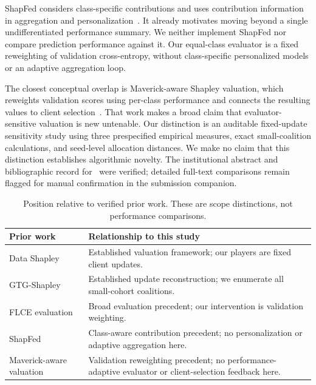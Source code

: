 \documentclass[conference,letterpaper]{IEEEtran}
\begin{document}
ShapFed considers class-specific contributions and uses contribution information in aggregation and personalization~\cite{shapfed}. It already motivates moving beyond a single undifferentiated performance summary. We neither implement ShapFed nor compare prediction performance against it. Our equal-class evaluator is a fixed reweighting of validation cross-entropy, without class-specific personalized models or an adaptive aggregation loop.

The closest conceptual overlap is Maverick-aware Shapley valuation, which reweights validation scores using per-class performance and connects the resulting values to client selection~\cite{rare}. That work makes a broad claim that evaluator-sensitive valuation is new untenable. Our distinction is an auditable fixed-update sensitivity study using three prespecified empirical measures, exact small-coalition calculations, and seed-level allocation distances. We make no claim that this distinction establishes algorithmic novelty. The institutional abstract and bibliographic record for~\cite{rare} were verified; detailed full-text comparisons remain flagged for manual confirmation in the submission companion.

\begin{table}[t]
\caption{Position relative to verified prior work. These are scope distinctions, not performance comparisons.}
\label{tab:related}\centering\small
\begin{tabular}{p{}p{}}\toprule
Prior work & Relationship to this study\\\midrule
Data Shapley~\cite{datashapley} & Established valuation framework; our players are fixed client updates.\\
GTG-Shapley~\cite{gtg} & Established update reconstruction; we enumerate all small-cohort coalitions.\\
FLCE evaluation~\cite{flce} & Broad evaluation precedent; our intervention is validation weighting.\\
ShapFed~\cite{shapfed} & Class-aware contribution precedent; no personalization or adaptive aggregation here.\\
Maverick-aware valuation~\cite{rare} & Validation reweighting precedent; no performance-adaptive evaluator or client-selection feedback here.\\\bottomrule
\end{tabular}
\end{table}
\end{document}
